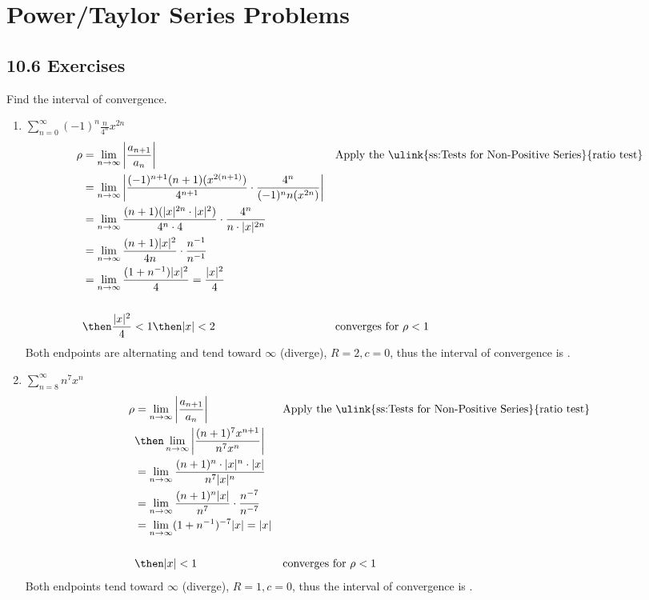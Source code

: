 \section{Power/Taylor Series Problems}

\subsection{10.6 Exercises}
Find the interval of convergence.

\begin{enumerate}[itemsep=24em]
  \item \(\displaystyle \sum_{n=0}^{\infty}  (-1)^n \frac{n}{4^n}x^{2n} \)
    \begin{align*}
      \rho &= \lim_{n \to \infty} \left| \frac{a_{n+1}}{a_n}  \right|
           && \text{Apply the \ulink{ss:Tests for Non-Positive Series}{ratio test}} \\
      &= \lim_{n \to \infty}
      \left|  \frac{(-1)^{n+1}(n+1)(x^{2(n+1)})}{4^{n+1}}
      \cdot
        \frac{4^n}{(-1)^{n}n(x^{2n})}
      \right| \\
      &= \lim_{n \to \infty}
      \frac{(n+1)(|x|^{2n} \cdot |x|^2)}{4^n \cdot 4}
      \cdot
      \frac{4^n}{n\cdot |x|^{2n}} \\
      &= \lim_{n \to \infty}
      \frac{(n+1)|x|^2}{4n} \cdot \frac{n^{-1}}{n^{-1}} \\
      &= \lim_{n \to \infty}
      \frac{(1+n^{-1})|x|^2}{4} = \frac{|x|^2}{4} \\\\
      &\then \frac{|x|^2}{4} < 1
      \then |x| < 2
      && \text{converges for}~\rho < 1
    \end{align*}
    Both endpoints are alternating and tend toward \(\infty \) (diverge), \(R = 2, c = 0\), thus the interval of
    convergence is .

  \vspace{-22em}
  \item \(\displaystyle \sum_{n=8}^{\infty} n^7 x^n \)
    \begin{align*}
      \rho &= \lim_{n \to \infty} \left| \frac{a_{n+1}}{a_n}  \right|
           && \text{Apply the \ulink{ss:Tests for Non-Positive Series}{ratio test}} \\
      &\then \lim_{n \to \infty}  \left| \frac{(n+1)^7 x^{n+1}}{n^7x^n} \right| \\
      &= \lim_{n \to \infty}  \frac{(n+1)^n \cdot |x|^n \cdot |x|}{n^7|x|^n} \\
      &= \lim_{n \to \infty}  \frac{(n+1)^n|x|}{n^7} \cdot \frac{n^{-7}}{n^{-7}} \\
      &= \lim_{n \to \infty}  (1+n^{-1})^{-7}|x|  = |x|\\\\
      &\then |x| < 1
      && \text{converges for}~\rho < 1
    \end{align*}
    Both endpoints tend toward \(\infty\) (diverge), \(R=1, c= 0\), thus the
    interval of convergence is .



\end{enumerate}

